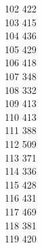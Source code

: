 { 102	422 \\
 103	415 \\
 104	436 \\
 105	429 \\
 106	418 \\
 107	348 \\
 108	332 \\
 109	413 \\
 110	413 \\
 111	388 \\
 112	509 \\
 113	371 \\
 114	336 \\
 115	428 \\
 116	431 \\
 117	469 \\
 118	381 \\
 119	420 \\
}
